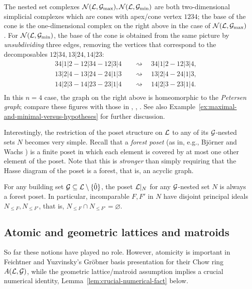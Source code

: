 \begin{example}
The nested set complexes $\mathcal{N}(\mathcal{L},\mathcal{G}_{\max}), \mathcal{N}(\mathcal{L},\mathcal{G}_{\min})$ are both two-dimensional simplicial complexes which are cones with
apex/cone vertex $1234$; the base of the cone is the one-dimensional complex on the right above in the case of $\mathcal{N}(\mathcal{L},\mathcal{G}_{\max})$.  For  $\mathcal{N}(\mathcal{L},\mathcal{G}_{\min})$, the base of the cone is obtained from the same picture by {\it unsubdividing}  three edges, removing the vertices that correspond to the
decomposables $12|34, 13|24, 14|23$:
\begin{align*}
34|1|2 - 12|34 - 12|3|4 &\quad  \rightsquigarrow \quad 34|1|2 - 12|3|4,\\
13|2|4 - 13|24 - 24|1|3 &\quad \rightsquigarrow \quad 13|2|4 - 24|1|3,\\
14|2|3 - 14|23 - 23|1|4 &\quad \rightsquigarrow \quad 14|2|3 - 23|1|4.\\
\end{align*}
In this $n=4$ case, the graph on the right above is homeomorphic to the {\it Petersen graph}; compare these figures with those in 
\cite[Fig.~2]{ArdilaKlivans}, %
\cite[Fig.~2]{FeichtnerSturmfels}, %
\cite[p.~21]{FY}.  See also Example~\ref{ex:maximal-and-minimal-versus-hypotheses} for further discussion.
\end{example}

Interestingly, the restriction of the poset structure on $\mathcal{L}$ to any of its $\mathcal{G}$-nested sets $N$ becomes very simple.  Recall that a {\it forest poset} (as in, e.g., Bj\"orner and Wachs \cite{BjornerWachs}) is a finite poset in which each element is covered by at most one other element of the poset.  Note that this is {\it stronger} than simply requiring that the Hasse diagram of the poset is a forest, that is, an acyclic graph. 

\begin{lemma}\label{lem:rooted-forest}
 \cite[Prop.~2.4(4)]{PagariaPezzoli}
 For any building set $\mathcal{G} \subseteq \mathcal{L} \setminus \{\hat{0}\}$,
 the poset $\mathcal{L}|_N$ for any $\mathcal{G}$-nested set $N$ is always a forest poset.
 In particular, incomparable $F,F'$ in $N$ have disjoint principal ideals  $N_{\leq F}, N_{\leq F'}$, that is, $N_{\leq F} \cap N_{\leq F'}=\varnothing$.
\end{lemma}


\subsection{Atomic and geometric lattices and matroids}
\label{matroid-background-section}
So far these notions have played no role.  However,
atomicity is important in Feichtner and Yuzvinsky's  Gr\"obner basis presentation for their Chow ring $A(\mathcal{L},\mathcal{G})$, while the geometric lattice/matroid assumption implies a crucial numerical identity, Lemma~\ref{lem:crucial-numerical-fact} below.

